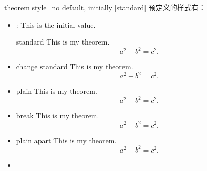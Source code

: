 \begin{docTcbKey}{theorem style}{=}{no default, initially |standard|}
预定义的样式有：
\begin{itemize}
%
\item{}: This is the initial value.
\begin{dispExample}
\begin{theorem}[theorem style=standard]{standard}{}
This is my theorem. \begin{equation*} a^2 + b^2 = c^2. \end{equation*}
\end{theorem}
\end{dispExample}
%
\item{}
\begin{dispExample}
\begin{theorem}[theorem style=change standard]{change standard}{}
This is my theorem. \begin{equation*} a^2 + b^2 = c^2. \end{equation*}
\end{theorem}
\end{dispExample}
%
\item{}
\begin{dispExample}
\begin{theorem}[theorem style=plain]{plain}{}
This is my theorem. \begin{equation*} a^2 + b^2 = c^2. \end{equation*}
\end{theorem}
\end{dispExample}
%
\item{}
\begin{dispExample}
\begin{theorem}[theorem style=break]{break}{}
This is my theorem. \begin{equation*} a^2 + b^2 = c^2. \end{equation*}
\end{theorem}
\end{dispExample}
%
\item{}
\begin{dispExample}
\begin{theorem}[theorem style=plain apart]{plain apart}{}
This is my theorem. \begin{equation*} a^2 + b^2 = c^2. \end{equation*}
\end{theorem}
\end{dispExample}
%
\item{}

\end{itemize}
\end{docTcbKey}
